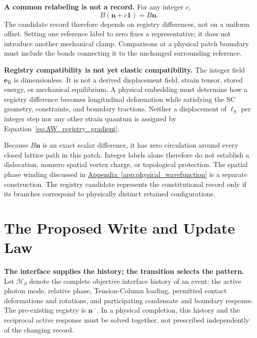 \noindent\textbf{A common relabeling is not a record.}
For any integer $c$,
\begin{equation}
    B(\mathbf n+c\mathbf 1)=B\mathbf n.
    \label{eq:AW_reference_gauge}
\end{equation}
The candidate record therefore depends on registry differences, not on a uniform offset. Setting one reference label to zero fixes a representative; it does not introduce another mechanical clamp. Comparisons at a physical patch boundary must include the bonds connecting it to the unchanged surrounding reference.

\medskip
\noindent\textbf{Registry compatibility is not yet elastic compatibility.}
The integer field $\mathbf e_{\mathrm R}$ is dimensionless. It is not a derived displacement field, strain tensor, stored energy, or mechanical equilibrium. A physical embedding must determine how a registry difference becomes longitudinal deformation while satisfying the SC geometry, constraints, and boundary tractions. Neither a displacement of $\ell_{\mathrm S}$ per integer step nor any other strain quantum is assigned by Equation~\eqref{eq:AW_registry_gradient}.

Because $B\mathbf n$ is an exact scalar difference, it has zero circulation around every closed lattice path in this patch. Integer labels alone therefore do not establish a dislocation, nonzero spatial vortex charge, or topological protection. The spatial phase winding discussed in \hyperref[app:physical_wavefunction]{Appendix~\ref*{app:physical_wavefunction}} is a separate construction. The registry candidate represents the constitutional record only if its branches correspond to physically distinct retained configurations.

\section{The Proposed Write and Update Law}
\label{sec:AW_write_update}

\noindent\textbf{The interface supplies the history; the transition selects the pattern.}
Let $\mathcal H_{\partial}$ denote the complete objective interface history of an event: the active photon mode, relative phase, Tension-Column loading, permitted contact deformations and rotations, and participating condensate and boundary response. The pre-existing registry is $\mathbf n^{-}$. In a physical completion, this history and the reciprocal active response must be solved together, not prescribed independently of the changing record.

